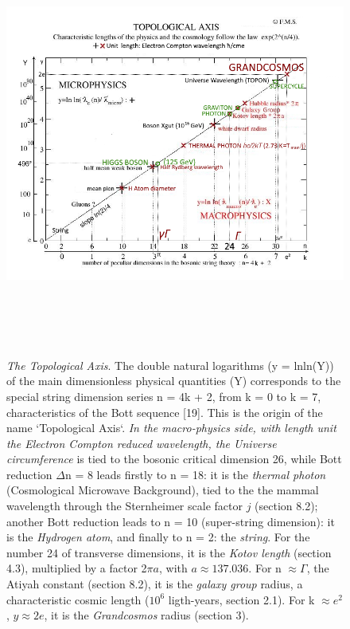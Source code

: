 \documentclass[twoside,draft]{article}
\begin{document}
\begin{sloppypar}
\begin{figure}
\centering
\includegraphics[width=\textwidth,height=14cm]{./figures/figure}
\caption{\textit{The Topological Axis}. The double natural logarithms (y = lnln(Y)) of the main dimensionless physical quantities (Y) corresponds to the special string dimension series n = 4k + 2, from k = 0 to k = 7, characteristics of the Bott sequence [19]. This is the origin of the name `Topological Axis`. 
\textit{In the macro-physics side, with length unit the Electron Compton reduced wavelength, the Universe circumference} is tied to the bosonic critical dimension 26, while Bott reduction $\Delta$n = 8 leads firstly to  n = 18: it is the \textit{thermal photon} (Cosmological Microwave Background), tied to the the mammal wavelength through the Sternheimer scale factor $j$ (section 8.2); another Bott reduction leads to n = 10 (super-string dimension): it is the \textit{Hydrogen atom}, and finally to n = 2: the \textit{string}. For the number 24 of transverse dimensions, it is the \textit{Kotov length} (section 4.3), multiplied by a factor 2$\pi a$, with $a \approx 137.036$. For n $\approx \Gamma$, the Atiyah constant (section 8.2), it is the \textit{galaxy group} radius, a characteristic cosmic length ($10^{6}$ ligth-years, section 2.1). For k $\approx e^{2}$, $y \approx 2e$, it is the \textit{Grandcosmos} radius (section 3). 
}
\end{figure}
\end{sloppypar}
\end{document}
